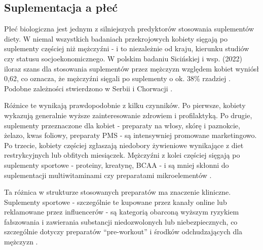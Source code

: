 
\subsection{Suplementacja a płeć}

Płeć biologiczna jest jednym z silniejszych predyktorów stosowania suplementów diety. W niemal wszystkich badaniach przekrojowych kobiety sięgają po suplementy częściej niż mężczyźni - i to niezależnie od kraju, kierunku studiów czy statusu socjoekonomicznego. W polskim badaniu Sicińskiej i wsp. (2022) iloraz szans dla stosowania suplementów przez mężczyzn względem kobiet wyniósł 0,62, co oznacza, że mężczyźni sięgali po suplementy o ok. 38\% rzadziej \cite{sicinska2022dietary}. Podobne zależności stwierdzono w Serbii i Chorwacji \cite{vidovic2022dietary,vzevzelj2018prevalence}.

Różnice te wynikają prawdopodobnie z kilku czynników. Po pierwsze, kobiety wykazują generalnie wyższe zainteresowanie zdrowiem i profilaktyką. Po drugie, suplementy przeznaczone dla kobiet - preparaty na włosy, skórę i paznokcie, żelazo, kwas foliowy, preparaty PMS - są intensywniej promowane marketingowo. Po trzecie, kobiety częściej zgłaszają niedobory żywieniowe wynikające z diet restrykcyjnych lub obfitych miesiączek. Mężczyźni z kolei częściej sięgają po suplementy sportowe - proteiny, kreatynę, BCAA - i są mniej skłonni do suplementacji multiwitaminami czy preparatami mikroelementów \cite{vidovic2022dietary,ficarra2022use}.

Ta różnica w strukturze stosowanych preparatów ma znaczenie kliniczne. Suplementy sportowe - szczególnie te kupowane przez kanały online lub reklamowane przez influencerów - są kategorią obarconą wyższym ryzykiem fałszowania i zawierania substancji niedozwolonych lub niebezpiecznych, co szczególnie dotyczy preparatów \enquote{pre-workout} i środków odchudzających dla mężczyzn \cite{lin2023hidden}.



